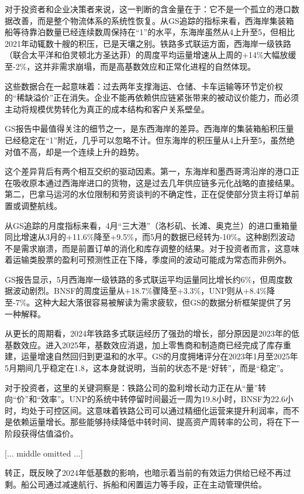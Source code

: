\documentclass[11pt]{ctexart}
\begin{document}
对于投资者和企业决策者来说，这一判断的含金量在于：它不是一个孤立的港口数据改善，而是整个物流体系的系统性恢复。从GS追踪的指标来看，西海岸集装箱船等待靠泊数量已经连续数周保持在“1”的水平，东海岸虽然从4上升至5，但相比2021年动辄数十艘的积压，已是天壤之别。铁路多式联运方面，西海岸一级铁路（联合太平洋和伯灵顿北方圣达菲）的周度平均运量增速从上周的+14\%大幅放缓至-2\%，这并非需求崩塌，而是高基数效应和正常化进程的自然体现。

这些数据合在一起意味着：过去两年支撑海运、仓储、卡车运输等环节定价权的“稀缺溢价”正在消失。企业不能再依赖供应链紧张带来的被动议价能力，而必须主动将规模优势转化为真正的成本结构和客户关系壁垒。

GS报告中最值得关注的细节之一，是东西海岸的差异。西海岸的集装箱船积压量已经稳定在“1”附近，几乎可以忽略不计。但东海岸的积压量从4上升至5，虽然绝对值不高，却是一个连续上升的趋势。

这个差异背后有两个相互交织的驱动因素。第一，东海岸和墨西哥湾沿岸的港口正在吸收原本通过西海岸进口的货物，这是过去几年供应链多元化战略的直接结果。第二，巴拿马运河的水位限制和劳资谈判的不确定性，正在促使部分货主将订单前置或调整航线。

从GS追踪的月度指标来看，4月“三大港”（洛杉矶、长滩、奥克兰）的进口重箱量同比增速从3月的+11.6\%降至+9.5\%，而5月的数据已经转为-10\%。这种剧烈波动不是需求崩溃，而是前置订单的消化和库存调整的结果。对于投资者而言，这意味着运输类股票的盈利可预测性正在下降，季度间的波动可能成为常态而非例外。

GS报告显示，5月西海岸一级铁路的多式联运平均运量同比增长约6\%，但周度数据波动剧烈。BNSF的周度运量从+18.7\%骤降至+3.3\%，UNP则从+8.4\%降至-7\%。这种大起大落很容易被解读为需求疲软，但GS的数据分析框架提供了另一种解释。

从更长的周期看，2024年铁路多式联运经历了强劲的增长，部分原因是2023年的低基数效应。进入2025年，基数效应消退，加上零售商和制造商已经完成了库存重建，运量增速自然回归到更温和的水平。GS的月度拥堵评分在2023年1月至2025年5月期间几乎稳定在1.8，这本身就说明，当前的状态不是“好转”，而是“稳定”。

对于投资者，这里的关键洞察是：铁路公司的盈利增长动力正在从“量”转向“价”和“效率”。UNP的系统中转停留时间最近一周为19.8小时，BNSF为22.6小时，均处于可控区间。这意味着铁路公司可以通过精细化运营来提升利润率，而不是依赖运量增长。那些能够持续降低中转时间、提高资产周转率的公司，将在下一阶段获得估值溢价。


[... middle omitted ...]

转正，既反映了2024年低基数的影响，也暗示着当前的有效运力供给已经不再过剩。船公司通过减速航行、拆船和闲置运力等手段，正在主动管理供给。
\end{document}
